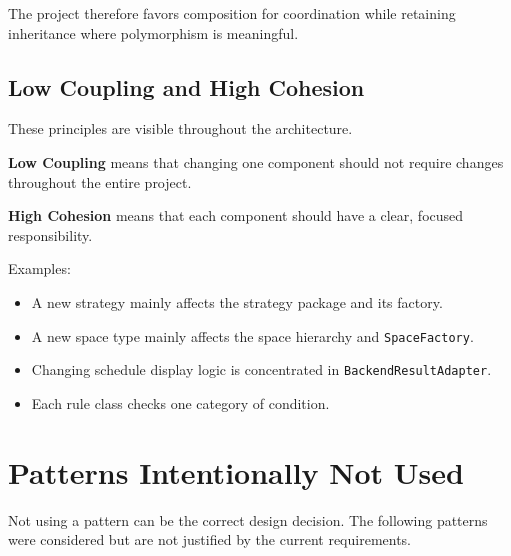 \documentclass[12pt,a4paper]{article}
\begin{document}
The project therefore favors composition for coordination while retaining
inheritance where polymorphism is meaningful.

\subsection{Low Coupling and High Cohesion}

These principles are visible throughout the architecture.

\textbf{Low Coupling} means that changing one component should not require
changes throughout the entire project.

\textbf{High Cohesion} means that each component should have a clear,
focused responsibility.

Examples:

\begin{itemize}
    \item A new strategy mainly affects the strategy package and its factory.
    \item A new space type mainly affects the space hierarchy and
    \texttt{SpaceFactory}.
    \item Changing schedule display logic is concentrated in
    \texttt{BackendResultAdapter}.
    \item Each rule class checks one category of condition.
\end{itemize}

\section{Patterns Intentionally Not Used}

Not using a pattern can be the correct design decision. The following patterns
were considered but are not justified by the current requirements.
\end{document}

